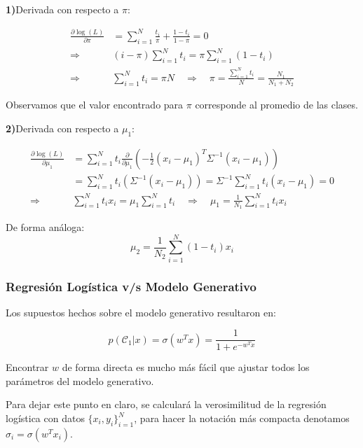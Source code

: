 \begin{itemize}
    \newpage
    \noindent \textbf{1)}Derivada con respecto a $\pi$:
    
    \begin{align}
    \frac{\partial\log(L)}{\partial\pi} &= \sum_{i=1}^N \frac{t_i}{\pi}+\frac{1-t_i}{1-\pi}=0\\
    \Rightarrow \quad & (i-\pi)\sum_{i=1}^Nt_i = \pi\sum_{i=1}^N(1-t_i)\\
    \Rightarrow \quad & \sum_{i=1}^Nt_i=\pi N \quad\Rightarrow\quad \pi = \frac{\sum_{i=1}^Nt_i}{N} = \frac{N_1}{N_1+N_2}
    \end{align}
    
    Observamos que el valor encontrado para $\pi$ corresponde al promedio de las clases.
    
    \noindent \textbf{2)}Derivada con respecto a $\mu_1$:
    
    \begin{align}
    \frac{\partial\log(L)}{\partial\mu_1} &= \sum_{i=1}^N t_i
    \frac{\partial}{\partial \mu_1}(-\frac{1}{2}(x_i-\mu_1)^T\Sigma^{-1}(x_i-\mu_1))\\
    &= \sum_{i=1}^N t_i(\Sigma^{-1}(x_i-\mu_1)) =
    \Sigma^{-1}\sum_{i=1}^N t_i(x_i-\mu_1) = 0\\
    \Rightarrow\quad & \sum_{i=1}^Nt_ix_i= \mu_1\sum_{i=1}^N t_i
    \quad\Rightarrow\quad \mu_1 = \frac{1}{N_1}\sum_{i=1}^Nt_ix_i
    \end{align}
    
    De forma análoga:
    \begin{equation}
    \mu_2 = \frac{1}{N_2}\sum_{i=1}^N(1-t_i)x_i
    \end{equation}
    
\end{itemize}

\subsubsection{Regresión Logística v/s Modelo Generativo}

Los supuestos hechos sobre el modelo generativo resultaron en:

\begin{equation}
p(\mathcal{C}_1|x) = \sigma(w^Tx) = \frac{1}{1+e^{-w^Tx}}
\end{equation}

Encontrar $w$ de forma directa es mucho más fácil que ajustar todos los parámetros del modelo generativo.

Para dejar este punto en claro, se calculará la verosimilitud de la regresión logística con datos $\{x_i,y_i\}_{i=1}^N$, para hacer la notación más compacta denotamos $\sigma_i = \sigma(w^Tx_i)$.


